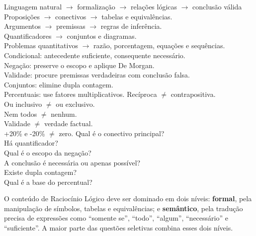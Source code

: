 {Linguagem natural $\rightarrow$ formalização $\rightarrow$ relações lógicas $\rightarrow$ conclusão válida}
{Proposições $\rightarrow$ conectivos $\rightarrow$ tabelas e equivalências.\\Argumentos $\rightarrow$ premissas $\rightarrow$ regras de inferência.\\Quantificadores $\rightarrow$ conjuntos e diagramas.\\Problemas quantitativos $\rightarrow$ razão, porcentagem, equações e sequências.}
{Condicional: antecedente suficiente, consequente necessário.\\Negação: preserve o escopo e aplique De Morgan.\\Validade: procure premissas verdadeiras com conclusão falsa.\\Conjuntos: elimine dupla contagem.\\Percentuais: use fatores multiplicativos.}
{Recíproca $\neq$ contrapositiva.\\Ou inclusivo $\neq$ ou exclusivo.\\Nem todos $\neq$ nenhum.\\Validade $\neq$ verdade factual.\\+20\% e -20\% $\neq$ zero.}
{Qual é o conectivo principal?\\Há quantificador?\\Qual é o escopo da negação?\\A conclusão é necessária ou apenas possível?\\Existe dupla contagem?\\Qual é a base do percentual?}

\begin{resumo}
O conteúdo de Raciocínio Lógico deve ser dominado em dois níveis: \textbf{formal}, pela manipulação de símbolos, tabelas e equivalências; e \textbf{semântico}, pela tradução precisa de expressões como ``somente se'', ``todo'', ``algum'', ``necessário'' e ``suficiente''. A maior parte das questões seletivas combina esses dois níveis.
\end{resumo}
